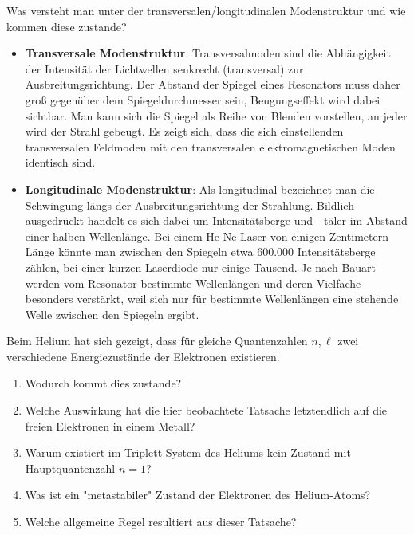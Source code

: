 \documentclass[12pt,a4paper,ngerman]{article}
\begin{document}
\begin{framed}
Was versteht man unter der transversalen/longitudinalen Modenstruktur und wie kommen diese zustande?
\end{framed}

\begin{itemize}
\item \textbf{Transversale Modenstruktur}: Transversalmoden sind die Abhängigkeit der Intensität der Lichtwellen senkrecht (transversal) zur Ausbreitungsrichtung. Der Abstand der Spiegel eines Resonators muss daher groß gegenüber dem Spiegeldurchmesser sein, Beugungseffekt wird dabei sichtbar. Man kann sich die Spiegel als Reihe von Blenden vorstellen, an jeder wird der Strahl gebeugt. Es zeigt sich, dass die sich einstellenden transversalen Feldmoden mit den transversalen elektromagnetischen Moden identisch sind. 
\item \textbf{Longitudinale Modenstruktur}: Als longitudinal bezeichnet man die Schwingung längs der Ausbreitungsrichtung der Strahlung. Bildlich ausgedrückt handelt es sich dabei um Intensitätsberge und - täler im Abstand einer halben Wellenlänge. Bei einem He-Ne-Laser von einigen Zentimetern Länge könnte man zwischen den Spiegeln etwa 600.000 Intensitätsberge zählen, bei einer kurzen Laserdiode nur einige Tausend. Je nach Bauart werden vom Resonator bestimmte Wellenlängen und deren Vielfache besonders verstärkt, weil sich nur für bestimmte Wellenlängen eine stehende Welle zwischen den Spiegeln ergibt. 
\end{itemize}



\begin{framed}
Beim Helium hat sich gezeigt, dass für gleiche Quantenzahlen $n, \ell$ zwei verschiedene Energiezustände der Elektronen existieren. 
\begin{enumerate}
\item Wodurch kommt dies zustande?
\item Welche Auswirkung hat die hier beobachtete Tatsache letztendlich auf die freien Elektronen in einem Metall?
\item Warum existiert im Triplett-System des Heliums kein Zustand mit Hauptquantenzahl $n=1$?
\item Was ist ein "metastabiler" Zustand der Elektronen des Helium-Atoms?
\item Welche allgemeine Regel resultiert aus dieser Tatsache?
\end{enumerate}
\end{framed}
\end{document}
